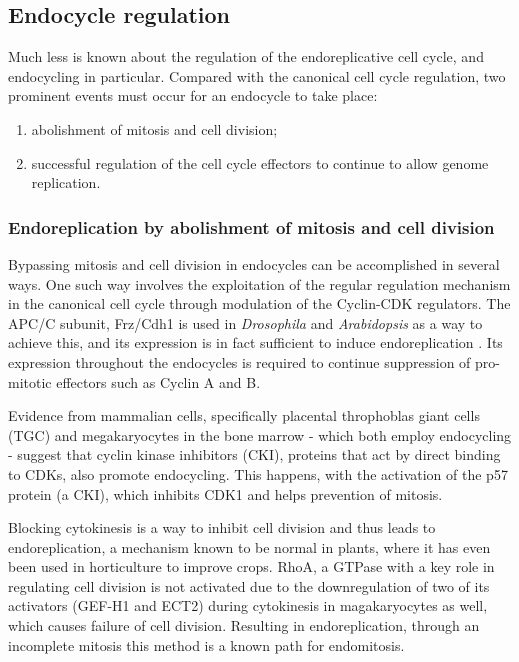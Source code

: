 \documentclass[11pt,twoside,a4paper]{report}
\begin{document}
			\subsection{Endocycle regulation}
			Much less is known about the regulation of the endoreplicative cell cycle, and endocycling in particular. Compared with the canonical cell cycle regulation, two prominent events must occur for an endocycle to take place:
			\begin{enumerate}
				\item abolishment of mitosis and cell division;
				\item successful regulation of the cell cycle effectors to continue to allow genome replication.
			\end{enumerate}
						
				\subsubsection{Endoreplication by abolishment of mitosis and cell division}
				Bypassing mitosis and cell division in endocycles can be accomplished in several ways. One such way involves the exploitation of the regular regulation mechanism in the canonical cell cycle through modulation of the Cyclin-CDK regulators. 
				The APC/C subunit, Frz/Cdh1 is used in \textit{Drosophila} and \textit{Arabidopsis} as a way to achieve this, and its expression is in fact sufficient to induce endoreplication \cite{asd}. Its expression throughout the endocycles is required to continue suppression of pro-mitotic effectors such as Cyclin A and B.
				
				Evidence from mammalian cells, specifically placental throphoblas giant cells (TGC) and megakaryocytes in the bone marrow - which both employ endocycling - suggest that cyclin kinase inhibitors (CKI), proteins that act by direct binding to CDKs, also promote endocycling. This happens, with the activation of the p57 protein (a CKI), which inhibits CDK1 and helps prevention of mitosis.	 

			 	Blocking cytokinesis is a way to inhibit cell division and thus leads to endoreplication, a mechanism known to be normal in plants, where it has even been used in horticulture to improve crops. RhoA, a GTPase with a key role in regulating cell division is not activated due to the downregulation of two of its activators (GEF-H1 and ECT2) during cytokinesis in magakaryocytes as well, which causes failure of cell division. Resulting in endoreplication, through an incomplete mitosis this method is a known path for endomitosis.
			 
\end{document}
